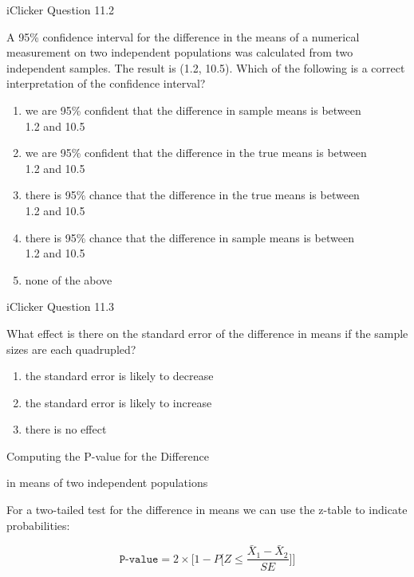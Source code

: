 \documentclass[14pt]{beamer}\usepackage[]{graphicx}\usepackage[]{color}
\begin{document}
\begin{frame}[fragile]{iClicker Question 11.2}

{\small{
A 95\% confidence interval for the difference in the means of a  numerical measurement on two independent populations was  calculated from two independent samples. The result is (1.2, 10.5).  Which of the following is a correct interpretation of the confidence  interval?
}}
{\footnotesize{
\begin{enumerate}
\item we are 95\% confident that the difference in sample  means is between \\ 1.2 and 10.5
\item we are 95\% confident that the difference in the true  means is between \\ 1.2 and 10.5
\item there is 95\% chance that the difference in the true means  is between \\ 1.2 and 10.5
\item there is 95\% chance that the difference in sample means  is between \\ 1.2 and 10.5
\item none of the above
\end{enumerate}
}}
\end{frame}

\begin{frame}[fragile]{iClicker Question 11.3}

What effect is there on the standard error of the difference in means  if the sample sizes are each quadrupled?

\begin{enumerate}
\item the standard error is likely to decrease
\item the standard error is likely to increase
\item there is no effect
\end{enumerate}
\end{frame}

\begin{frame}[fragile]{Computing the P-value for the Difference}

in means of two independent populations

For a two-tailed test for the difference in means we can use the z-table to indicate probabilities:

\begin{equation*}
  \texttt{P-value} = 2 \times \Big[ 1 - P \Big[ Z \le \frac{ \bar{X}_1 - \bar{X}_2}{SE} \Big]  \Big]
\end{equation*}
\end{frame}
\end{document}
